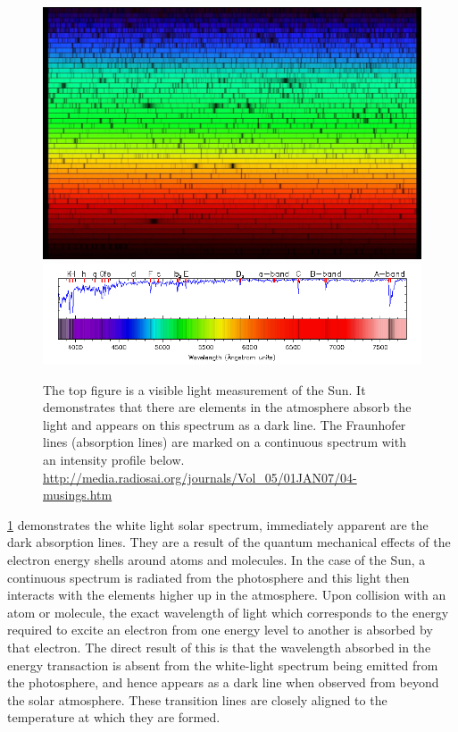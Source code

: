 \begin{figure}
	\centering
	\includegraphics[width=\linewidth]{Chapter1/Figs/sun_spectrum}
	\includegraphics[width=\linewidth]{Chapter1/Figs/fraunhofer_lines}
	\caption{The top figure is a visible light measurement of the Sun. It demonstrates that there are elements in the atmosphere absorb the light and appears on this spectrum as a dark line. The Fraunhofer lines (absorption lines) are marked on a continuous spectrum with an intensity profile below.
	\url{http://media.radiosai.org/journals/Vol_05/01JAN07/04-musings.htm}}
	\label{fig:fraunhofer}
\end{figure}


\cref{fig:fraunhofer} demonstrates the white light solar spectrum, immediately apparent are the dark absorption lines.
They are a result of the quantum mechanical effects of the electron energy shells around atoms and molecules.
In the case of the Sun, a continuous spectrum is radiated from the photosphere and this light then interacts with the elements higher up in the atmosphere.
Upon collision with an atom or molecule, the exact wavelength of light which corresponds to the energy required to excite an electron from one energy level to another is absorbed by that electron.
The direct result of this is that the wavelength absorbed in the energy transaction is absent from the white-light spectrum being emitted from the photosphere, and hence appears as a dark line when observed from beyond the solar atmosphere.
These transition lines are closely aligned to the temperature at which they are formed.

